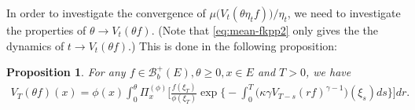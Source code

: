 \documentclass[UTF8]{pkuthss}
\theoremstyle{plain}
\newtheorem{prop}[thm]{Proposition}
\theoremstyle{definition}
\numberwithin{equation}{section}
\begin{document}
	In order to investigate the convergence of $\mu\big( V_t(\theta \eta_t f) \big)/ \eta_t$, we need to investigate the properties of $\theta\to V_t(\theta f)$.
	(Note that \eqref{eq:mean-fkpp2} only gives the the dynamics of $t\to V_t(\theta f)$.)
	This is done in the following proposition:

\begin{prop}
	For any $f\in \mathscr B^+_b(E),\theta \geq 0,x\in E$ and $T>0$, we have
\begin{align}\label{eq: equation for Vt(theta f) for theta}
	V_T ( \theta f) ( x)
	= \phi( x) \int_0^\theta \Pi_x^{(\phi)} \Big[ \frac{ f(\xi_T) } { \phi(\xi_T) } \exp\Big\{ - \int_0^T \big( \kappa \gamma V_{T-s} (r f)^{ \gamma - 1} \big) ( \xi_s) ds\Big\} \Big] dr.
\end{align}
\end{prop}
\end{document}
